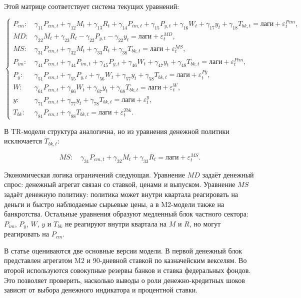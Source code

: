 Этой матрице соответствует система текущих уравнений:

$$
\left\{
\begin{array}{ll}
P_{cm}:&
\gamma_{11}P_{cm,t}+\gamma_{12}M_t+\gamma_{13}R_t+\gamma_{14}P_{im,t}
+\gamma_{15}P_{y,t}+\gamma_{16}W_t+\gamma_{17}y_t+\gamma_{18}T_{bk,t}
=
\text{лаги}+\varepsilon^{Pcm}_t,
\\[0.5em]

MD:&
\gamma_{22}M_t+\gamma_{23}R_t-\gamma_{22}P_{y,t}-\gamma_{22}y_t
=
\text{лаги}+\varepsilon^{MD}_t,
\\[0.5em]

MS:&
\gamma_{31}P_{cm,t}+\gamma_{32}M_t+\gamma_{33}R_t+\gamma_{38}T_{bk,t}
=
\text{лаги}+\varepsilon^{MS}_t,
\\[0.5em]

P_{im}:&
\gamma_{41}P_{cm,t}+\gamma_{44}P_{im,t}+\gamma_{45}P_{y,t}
+\gamma_{46}W_t+\gamma_{47}y_t+\gamma_{48}T_{bk,t}
=
\text{лаги}+\varepsilon^{Pim}_t,
\\[0.5em]

P_y:&
\gamma_{51}P_{cm,t}+\gamma_{55}P_{y,t}+\gamma_{56}W_t
+\gamma_{57}y_t+\gamma_{58}T_{bk,t}
=
\text{лаги}+\varepsilon^{Py}_t,
\\[0.5em]

W:&
\gamma_{61}P_{cm,t}+\gamma_{66}W_t+\gamma_{67}y_t+\gamma_{68}T_{bk,t}
=
\text{лаги}+\varepsilon^{W}_t,
\\[0.5em]

y:&
\gamma_{71}P_{cm,t}+\gamma_{77}y_t+\gamma_{78}T_{bk,t}
=
\text{лаги}+\varepsilon^{y}_t,
\\[0.5em]

T_{bk}:&
\gamma_{81}P_{cm,t}+\gamma_{88}T_{bk,t}
=
\text{лаги}+\varepsilon^{Tbk}_t.
\end{array}
\right.
$$

В TR-модели структура аналогична, но из уравнения денежной политики исключается $T_{bk,t}$:

$$
MS:
\quad
\gamma_{31}P_{cm,t}
+\gamma_{32}M_t
+\gamma_{33}R_t
=
\text{лаги}
+
\varepsilon^{MS}_t.
$$

Экономическая логика ограничений следующая. Уравнение $MD$ задаёт денежный спрос: денежный агрегат связан со ставкой, ценами и выпуском. Уравнение $MS$ задаёт денежную политику: политика может внутри квартала реагировать на деньги и быстро наблюдаемые сырьевые цены, а в M2-модели также на банкротства. Остальные уравнения образуют медленный блок частного сектора: $P_{im}$, $P_y$, $W$, $y$ и $T_{bk}$ не реагируют внутри квартала на $M$ и $R$, но могут реагировать на $P_{cm}$.

В статье оцениваются две основные версии модели. В первой денежный блок представлен агрегатом M2 и 90-дневной ставкой по казначейским векселям. Во второй используются совокупные резервы банков и ставка федеральных фондов. Это позволяет проверить, насколько выводы о роли денежно-кредитных шоков зависят от выбора денежного индикатора и процентной ставки.
